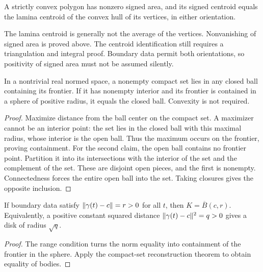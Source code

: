 \begin{proposition}
\label{prop:geometric-centroid}
A strictly convex polygon has nonzero signed area, and its signed centroid
equals the lamina centroid of the convex hull of its vertices, in either
orientation.
\end{proposition}
The lamina centroid is generally not the average of the vertices.
Nonvanishing of signed area is proved above. The centroid identification
still requires a triangulation and integral proof.
Boundary data permit both orientations, so positivity of signed area
must not be assumed silently.

\begin{lemma}
\label{lem:ball-frontier}
\leanok
In a nontrivial real normed space, a nonempty compact set lies in any
closed ball containing its frontier. If it has nonempty interior and its
frontier is contained in a sphere of positive radius, it equals the closed
ball. Convexity is not required.
\end{lemma}
\begin{proof}
\leanok
Maximize distance from the ball center on the compact set. A maximizer
cannot be an interior point: the set lies in the closed ball with this
maximal radius, whose interior is the open ball. Thus the maximum occurs
on the frontier, proving containment.
For the second claim, the open ball contains no frontier point. Partition
it into its intersections with the interior of the set and the complement
of the set. These are disjoint open pieces, and the first is nonempty.
Connectedness forces the entire open ball into the set. Taking closures
gives the opposite inclusion.
\end{proof}

\begin{proposition}
\label{prop:disk}
\leanok
{}
If boundary data satisfy $\lVert \gamma(t)-c\rVert=r>0$ for all $t$, then
$K=\overline B(c,r)$. Equivalently, a positive constant squared distance
$\lVert \gamma(t)-c\rVert^2=q>0$ gives a disk of radius $\sqrt q$.
\end{proposition}
\begin{proof}
\leanok
The range condition turns the norm equality into containment of the
frontier in the sphere. Apply the compact-set reconstruction theorem to
obtain equality of bodies.
\end{proof}

